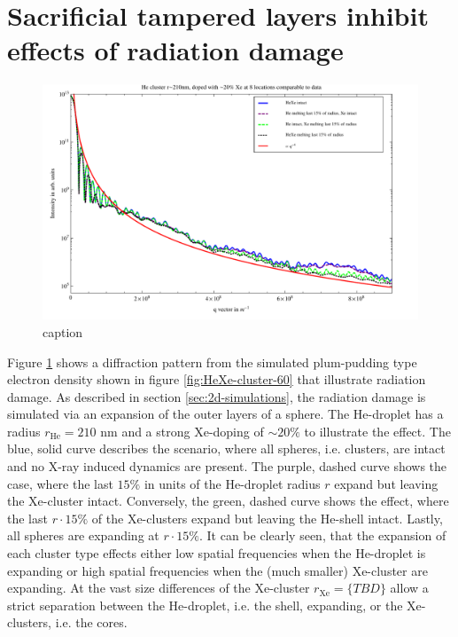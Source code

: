 \section{Sacrificial tampered layers inhibit effects of radiation damage}\label{sec:helium-xenon-data}
\begin{figure}
	\centering
		\includegraphics[width=1.00\textwidth]{images/results/simulations-damage-explain.pdf}
	\caption{caption}
	\label{fig:simulations-damage-explain}
\end{figure}
Figure \ref{fig:simulations-damage-explain} shows a diffraction pattern from the simulated plum-pudding type electron density shown in figure \ref{fig:HeXe-cluster-60} that illustrate radiation damage. As described in section \ref{sec:2d-simulations}, the radiation damage is simulated via an expansion of the outer layers of a sphere. The He-droplet has a radius $r_{\text{He}}=210$ nm and a strong Xe-doping of $\sim 20 \%$ to illustrate the effect. The blue, solid curve describes the scenario, where all spheres, i.e. clusters, are intact and no X-ray induced dynamics are present. The purple, dashed curve shows the case, where the last $15 \%$ in units of the He-droplet radius $r$ expand but leaving the Xe-cluster intact. Conversely, the green, dashed curve shows the effect, where the last $r\cdot 15 \%$ of the Xe-clusters expand but leaving the He-shell intact. Lastly, all spheres are expanding at $r\cdot 15 \%$. It can be clearly seen, that the expansion of each cluster type effects either low spatial frequencies when the He-droplet is expanding or high spatial frequencies when the (much smaller) Xe-cluster are expanding. At the vast size differences of the Xe-cluster $r_{\text{Xe}}=\{TBD\}$ allow a strict separation between the He-droplet, i.e. the shell, expanding, or the Xe-clusters, i.e. the cores.\\
